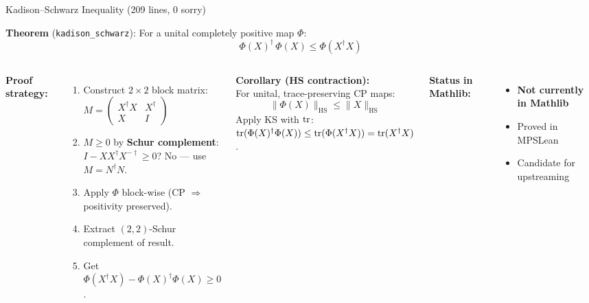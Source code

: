 \documentclass[aspectratio=169,10pt]{beamer}
\begin{document}
\begin{frame}{Kadison--Schwarz Inequality \textcolor{leangreen}{(209 lines, 0 sorry)}}
    \vspace{-0.5em}

    \textbf{Theorem} (\texttt{kadison\_schwarz}):
    {\small For a unital completely positive map $\Phi$:}
    \[
        \Phi(X)^\dagger\,\Phi(X) \leq  \Phi(X^\dagger X)
    \]

    \vspace{0.15em}
    \begin{columns}[T]
        \textbf{\textcolor{leangreen}{Proof strategy:}}
        \begin{enumerate}\itemsep0.1em\small
            \item Construct $2\times 2$ block matrix:
                $M = \begin{pmatrix} X^\dagger X & X^\dagger \\ X & I \end{pmatrix}$
            \item $M \geq 0$ by \textbf{Schur complement}:\\
                $I - X X^\dagger X^{-\dagger} \geq 0$?
                No --- use $M = N^\dagger N$.
            \item Apply $\Phi$ block-wise (CP $\Rightarrow$ positivity preserved).
            \item Extract $(2,2)$-Schur complement of result.
            \item Get $\Phi(X^\dagger X) - \Phi(X)^\dagger\Phi(X) \geq 0$.
        \end{enumerate}

        \textbf{\textcolor{leangreen}{Corollary} (HS contraction):}\\
        {\small For unital, trace-preserving CP maps:}
        \[
            \|\Phi(X)\|_{\mathrm{HS}} \leq  \|X\|_{\mathrm{HS}}
        \]
        {\scriptsize Apply KS with $\mathrm{tr}$:
        $\mathrm{tr}(\Phi(X)^\dagger\Phi(X)) \leq \mathrm{tr}(\Phi(X^\dagger X)) = \mathrm{tr}(X^\dagger X)$.}

        \vspace{0.3em}
        {\small\textbf{Status in Mathlib:}}
        \begin{itemize}\itemsep0.05em\scriptsize
            \item[\textcolor{softred}{$\times$}] \textbf{Not currently in Mathlib}
            \item[\textcolor{leangreen}{\checkmark}] Proved in MPSLean
            \item[\textcolor{leangreen}{\checkmark}] Candidate for upstreaming
        \end{itemize}
    \end{columns}
\end{frame}
\end{document}
